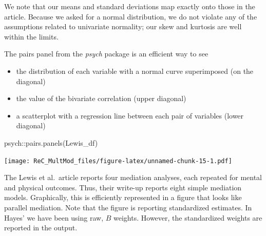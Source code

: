 \documentclass[
]{book}
\newenvironment{Shaded}{\begin{snugshade}}{\end{snugshade}}
\newcommand{\FunctionTok}[1]{\textcolor[rgb]{0.00,0.00,0.00}{#1}}
\newcommand{\NormalTok}[1]{#1}
\newcommand{\SpecialCharTok}[1]{\textcolor[rgb]{0.00,0.00,0.00}{#1}}
\providecommand{\tightlist}{%
  \setlength{\itemsep}{0pt}\setlength{\parskip}{0pt}}
\begin{document}
We note that our means and standard deviations map exactly onto those in the article. Because we asked for a normal distribution, we do not violate any of the assumptions related to univariate normality; our skew and kurtosis are well within the limits.

The pairs panel from the \emph{psych} package is an efficient way to see

\begin{itemize}
\tightlist
\item
  the distribution of each variable with a normal curve superimposed (on the diagonal)
\item
  the value of the bivariate correlation (upper diagonal)
\item
  a scatterplot with a regression line between each pair of variables (lower diagonal)
\end{itemize}

\begin{Shaded}
\begin{Highlighting}[]
\NormalTok{psych}\SpecialCharTok{::}\FunctionTok{pairs.panels}\NormalTok{(Lewis\_df)}
\end{Highlighting}
\end{Shaded}

\texttt{[image: ReC\_MultMod\_files/figure-latex/unnamed-chunk-15-1.pdf]}

The Lewis et al.~article \citeyearpar{lewis_applying_2017} reports four mediation analyses, each repeated for mental and physical outcomes. Thus, their write-up reports eight simple mediation models. Graphically, this is efficiently represented in a figure that looks like parallel mediation. Note that the figure is reporting standardized estimates. In Hayes' \citeyearpar{hayes_introduction_2018} we have been using raw, \(B\) weights. However, the standardized weights are reported in the output.
\end{document}
